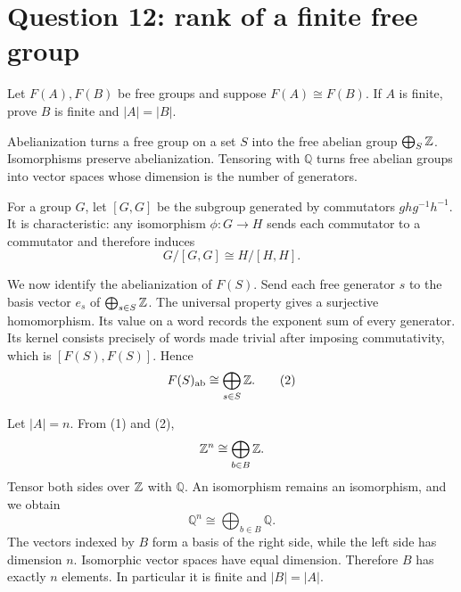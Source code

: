 \documentclass[11pt,openany]{book}
\newcommand{\Q}{\mathbb Q}\newcommand{\R}{\mathbb R}
\begin{document}
\section{Question 12: rank of a finite free group}
\begin{questionbox}
Let $F(A),F(B)$ be free groups and suppose $F(A)\cong F(B)$. If $A$ is finite, prove $B$ is finite and $|A|=|B|$.
\end{questionbox}
\begin{approachbox}
Abelianization turns a free group on a set $S$ into the free abelian group $\bigoplus_S\mathbb Z$. Isomorphisms preserve abelianization. Tensoring with $\Q$ turns free abelian groups into vector spaces whose dimension is the number of generators.
\end{approachbox}
\begin{solutionbox}
For a group $G$, let $[G,G]$ be the subgroup generated by commutators $ghg^{-1}h^{-1}$. It is characteristic: any isomorphism $\phi:G\to H$ sends each commutator to a commutator and therefore induces
\[
G/[G,G]\cong H/[H,H]. \tag{1}
\]

We now identify the abelianization of $F(S)$. Send each free generator $s$ to the basis vector $e_s$ of $\bigoplus_{s\in S}\mathbb Z$. The universal property gives a surjective homomorphism. Its value on a word records the exponent sum of every generator. Its kernel consists precisely of words made trivial after imposing commutativity, which is $[F(S),F(S)]$. Hence
\[
F(S)_{\mathrm{ab}}\cong\bigoplus_{s\in S}\mathbb Z. \tag{2}
\]

Let $|A|=n$. From (1) and (2),
\[
\mathbb Z^n\cong\bigoplus_{b\in B}\mathbb Z.
\]
Tensor both sides over $\mathbb Z$ with $\Q$. An isomorphism remains an isomorphism, and we obtain
\[
\Q^n\cong\bigoplus_{b\in B}\Q.
\]
The vectors indexed by $B$ form a basis of the right side, while the left side has dimension $n$. Isomorphic vector spaces have equal dimension. Therefore $B$ has exactly $n$ elements. In particular it is finite and $|B|=|A|$.
\end{solutionbox}
\end{document}
